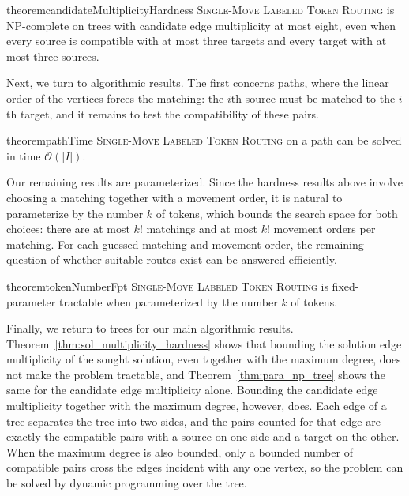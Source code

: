 \documentclass[a4paper,USenglish,thm-restate]{lipics-v2021}
\theoremstyle{problemstyle}
\begin{document}
\begin{restatable}{theorem}{candidateMultiplicityHardness}
\label{thm:para_np_tree}
\textsc{Single-Move Labeled Token Routing} is \textsf{NP}-complete on trees
with candidate edge multiplicity at most eight, even when every source is
compatible with at most three targets and every target with at most three
sources.
\end{restatable}


Next, we turn to algorithmic results. The first concerns paths, where the linear
order of the vertices forces the matching: the $i$th source must be matched
to the $i$th target, and it remains to test the compatibility of these
pairs.

\begin{restatable}{theorem}{pathTime}
\label{thm:path_time}
\textsc{Single-Move Labeled Token Routing} on a path can be solved in time
$\mathcal{O}(|I|)$.
\end{restatable}

Our remaining results are parameterized. Since the hardness results above
involve choosing a matching together with a movement order, it is natural to
parameterize by the number $k$ of tokens, which bounds the search space for both
choices: there are at most $k!$ matchings and at most $k!$ movement orders per
matching. For
each guessed matching and movement order, the remaining question of whether
suitable routes exist can be answered efficiently.

\begin{restatable}{theorem}{tokenNumberFpt}
\label{thm:token_number_fpt}
\textsc{Single-Move Labeled Token Routing} is fixed-parameter tractable when
parameterized by the number $k$ of tokens.
\end{restatable}

Finally, we return to trees for our main algorithmic results.
Theorem~\ref{thm:sol_multiplicity_hardness} shows that bounding the solution
edge multiplicity of the sought solution, even together with the maximum
degree, does not make the
problem tractable, and Theorem~\ref{thm:para_np_tree} shows the same for the
candidate edge multiplicity alone. Bounding the candidate edge multiplicity
together with the maximum degree, however, does. Each edge of a tree
separates the tree into two sides, and the pairs counted for that edge are
exactly the compatible pairs with a source on one side and a target on the
other. When the maximum degree is also bounded, only a bounded number of
compatible pairs cross the edges incident with any one vertex, so the
problem can be solved by dynamic programming over the tree.
\end{document}
